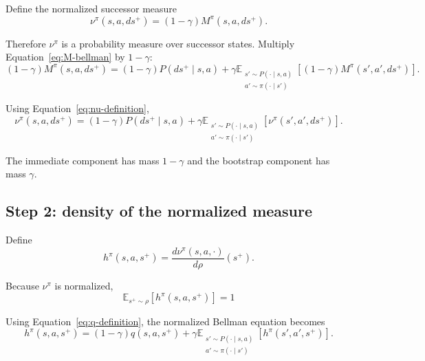\documentclass[11pt]{article}
\begin{document}
Define the normalized successor measure
\begin{equation}
\boxed{ \nu^\pi(s,a,ds^+) = (1-\gamma) M^\pi(s,a,ds^+). }
\label{eq:nu-definition}
\end{equation}

Therefore $\nu^\pi$ is a probability measure over successor states.
Multiply Equation~\eqref{eq:M-bellman} by $1-\gamma$:
\begin{equation}
    (1-\gamma)M^\pi(s,a,ds^+) = (1-\gamma)P(ds^+\mid s,a)
                                + \gamma \mathbb E_{\substack{ s'\sim P(\cdot\mid s,a)\\  a'\sim\pi(\cdot\mid s') }} \left[ (1-\gamma) M^\pi(s',a',ds^+) \right].
\end{equation}

Using Equation~\eqref{eq:nu-definition},
\begin{equation}
\boxed{ 
\nu^\pi(s,a,ds^+) = (1-\gamma)P(ds^+\mid s,a) 
                        + \gamma \mathbb E_{\substack{ s'\sim P(\cdot\mid s,a)\\ a'\sim\pi(\cdot\mid s') }}
                                \left[ \nu^\pi(s',a',ds^+) \right].
}
\label{eq:nu-bellman}
\end{equation}

The immediate component has mass $1-\gamma$ and the bootstrap component has mass $\gamma$.

\subsection*{Step 2: density of the normalized measure}

Define
\begin{equation}
    h^\pi(s,a,s^+) = \frac{d\nu^\pi(s,a,\cdot)}{d\rho}(s^+). 
    \label{eq:h-definition}
\end{equation}

Because $\nu^\pi$ is normalized,
\begin{equation}
\boxed{ \mathbb E_{s^+\sim\rho} \left[ h^\pi(s,a,s^+) \right] = 1 }
\label{eq:h-normalized}
\end{equation}

Using Equation~\eqref{eq:q-definition}, the normalized Bellman equation becomes
\begin{equation}
h^\pi(s,a,s^+) = (1-\gamma)q(s,a,s^+) + \gamma \mathbb E_{\substack{ s'\sim P(\cdot\mid s,a)\\ a'\sim\pi(\cdot\mid s') }}
                                            \left[ h^\pi(s',a',s^+) \right]. \label{eq:h-bellman}
\end{equation}
\end{document}

